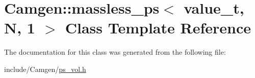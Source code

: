\hypertarget{a00357}{}\section{Camgen\+:\+:massless\+\_\+ps$<$ value\+\_\+t, N, 1 $>$ Class Template Reference}
\label{a00357}


The documentation for this class was generated from the following file\+:\begin{DoxyCompactItemize}
\item 
include/\+Camgen/\hyperlink{a00746}{ps\+\_\+vol.\+h}\end{DoxyCompactItemize}
